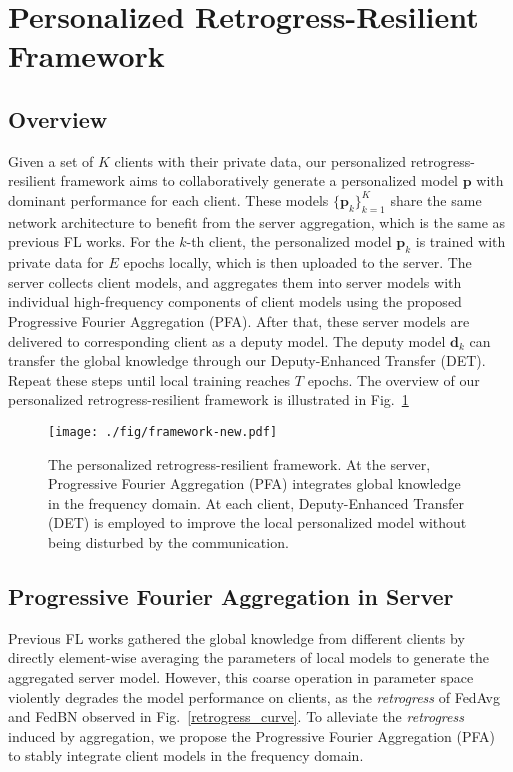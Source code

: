 \documentclass[runningheads]{llncs}
\begin{document}
\section{Personalized Retrogress-Resilient Framework}
\subsection{Overview}
Given a set of $K$ clients with their private data, our personalized retrogress-resilient framework aims to collaboratively generate a personalized model $\bm{p}$ with dominant performance for each client. These models $\{\bm{p}_{k}\}_{k=1}^{K}$ share the same network architecture to benefit from the server aggregation, which is the same as previous FL works. For the $k$-th client, the personalized model $\bm{p}_{k}$ is trained with private data for $E$ epochs locally, which is then uploaded to the server. The server collects client models, and aggregates them into server models with individual high-frequency components of client models using the proposed Progressive Fourier Aggregation (PFA). After that, these server models are delivered to corresponding client as a deputy model. The deputy model $\bm{d}_{k}$ can transfer the global knowledge through our Deputy-Enhanced Transfer (DET). Repeat these steps until local training reaches $T$ epochs. The overview of our personalized retrogress-resilient framework is illustrated in Fig.~\ref{framework}

\begin{figure}[t]
    \centering
    \texttt{[image: ./fig/framework-new.pdf]}
    \caption{The personalized retrogress-resilient framework. At the server, Progressive Fourier Aggregation (PFA) integrates global knowledge in the frequency domain. At each client, Deputy-Enhanced Transfer (DET) is employed to improve the local personalized model without being disturbed by the communication.}
    \label{framework}
\end{figure}

\subsection{Progressive Fourier Aggregation in Server}
Previous FL works \cite{fedavg,fedprox,andreux2020siloed,li2021fedbn} gathered the global knowledge from different clients by directly element-wise averaging the parameters of local models to generate the aggregated server model. However, this coarse operation in parameter space violently degrades the model performance on clients, as the \textit{retrogress} of FedAvg \cite{fedavg} and FedBN \cite{li2021fedbn} observed in Fig.~\ref{retrogress_curve}. To alleviate the \textit{retrogress} induced by aggregation, we propose the Progressive Fourier Aggregation (PFA) to stably integrate client models in the frequency domain. 
\end{document}
